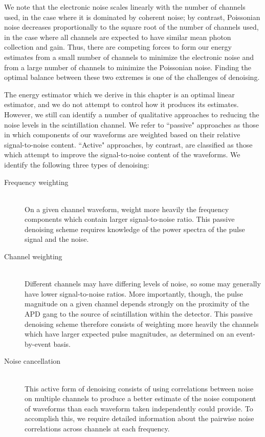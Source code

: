 We note that the electronic noise scales linearly with the number of channels used, in the case where it is dominated by coherent noise; by contrast, Poissonian noise decreases proportionally to the square root of the number of channels used, in the case where all channels are expected to have similar mean photon collection and gain.  Thus, there are competing forces to form our energy estimates from a small number of channels to minimize the electronic noise and from a large number of channels to minimize the Poissonian noise.  Finding the optimal balance between these two extremes is one of the challenges of denoising.

The energy estimator which we derive in this chapter is an optimal linear estimator, and we do not attempt to control how it produces its estimates.  However, we still can identify a number of qualitative approaches to reducing the noise levels in the scintillation channel.  We refer to ``passive" approaches as those in which components of our waveforms are weighted based on their relative signal-to-noise content.  ``Active" approaches, by contrast, are classified as those which attempt to improve the signal-to-noise content of the waveforms.  We identify the following three types of denoising:
\begin{description}
\item[Frequency weighting] \hfill \\
On a given channel waveform, weight more heavily the frequency components which contain larger signal-to-noise ratio.  This passive denoising scheme requires knowledge of the power spectra of the pulse signal and the noise.

\item[Channel weighting] \hfill \\
Different channels may have differing levels of noise, so some may generally have lower signal-to-noise ratios.  More importantly, though, the pulse magnitude on a given channel depends strongly on the proximity of the APD gang to the source of scintillation within the detector.  This passive denoising scheme therefore consists of weighting more heavily the channels which have larger expected pulse magnitudes, as determined on an event-by-event basis.

\item[Noise cancellation] \hfill \\
This active form of denoising consists of using correlations between noise on multiple channels to produce a better estimate of the noise component of waveforms than each waveform taken independently could provide.  To accomplish this, we require detailed information about the pairwise noise correlations across channels at each frequency.
\end{description}


